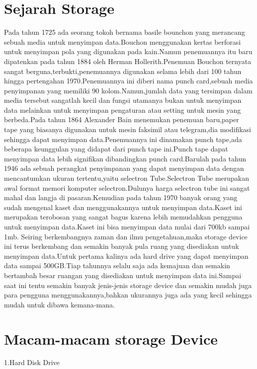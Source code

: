 \section{Sejarah Storage}
Pada tahun 1725 ada seorang tokoh bernama basile bounchon yang merancang sebuah media untuk menyimpan data.Bouchon menggunakan kertas berforasi untuk menyimpan pola yang digunakan pada kain.Namun penemuannya itu baru dipatenkan pada tahun 1884 oleh Herman Hollerith.Penemuan Bouchon ternyata sangat berguna,terbukti,penemuannya digunakan selama lebih dari 100 tahun hingga pertengahan 1970.Penemuannya ini diberi nama punch card,sebuah media penyimpanan yang memiliki 90 kolom.Namun,jumlah data yang tersimpan dalam media tersebut sangatlah kecil dan fungsi utamanya bukan untuk menyimpan data melainkan untuk menyimpan pengaturan atau setting untuk mesin yang berbeda.Pada tahun 1864 Alexander Bain menemukan penemuan baru,paper tape yang biasanya digunakan untuk mesin faksimil atau telegram,dia modifikasi sehingga dapat menyimpan data.Penemuannya ini dinamakan punch tape,ada beberapa keunggulan yang didapat dari punch tape ini.Punch tape dapat menyimpan data lebih signifikan dibandingkan punch card.Barulah pada tahun 1946 ada sebuah perangkat penyimpanan yang dapat menyimpan data dengan mencantumkan ukuran tertentu,yaitu selectron Tube.Selectron Tube merupakan awal format memori komputer selectron.Dulunya harga selectron tube ini sangat mahal dan langja di pasaran.Kemudian pada tahun 1970 banyak orang yang sudah mengenal kaset dan menggunakannya untuk menyimpan data.Kaset ini merupakan terobosan yang sangat bagus karena lebih memudahkan pengguna untuk menyimpan data.Kaset ini bisa menyimpan data mulai dari 700kb sampai 1mb.
Seiring berkembangnya zaman dan ilmu pengetahuan,maka storage device ini terus berkembang dan semakin banyak pula ruang yang disediakan untuk menyimpan  data.Untuk pertama kalinya ada hard drive yang dapat menyimpan data sampai 500GB.Tiap tahunnya selalu saja ada kemajuan dan semakin bertambah besar ruangan yang disediakan untuk menyimpan data ini.Sampai saat ini tentu semakin banyak jenis-jenis storage device dan semakin mudah juga para pengguna menggunakannya,bahkan ukurannya juga ada yang kecil sehingga mudah untuk dibawa kemana-mana.

\section{Macam-macam storage Device}

1.Hard Disk Drive

